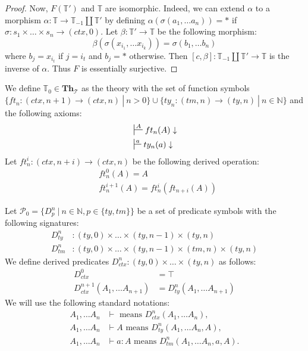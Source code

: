 \documentclass{amsart}
\theoremstyle{definition}
\theoremstyle{remark}
\newcommand{\cat}[1]{\mathbf{#1}}
\newcommand{\Th}{\cat{Th}}
\newcommand{\ThT}{\Th_{\mathcal{T}}}
\numberwithin{figure}{section}
\begin{document}
\begin{proof}
Now, $F(\mathbb{T}')$ and $\mathbb{T}$ are isomorphic.
Indeed, we can extend $\alpha$ to a morphism $\alpha : \mathbb{T} \to \mathbb{T}_{-1} \amalg \mathbb{T}'$
by defining $\alpha(\sigma(a_1, \ldots a_n)) = *$ if $\sigma : s_1 \times \ldots \times s_n \to (ctx,0)$.
Let $\beta : \mathbb{T}' \to \mathbb{T}$ be the following morphism:
\[ \beta(\sigma(x_{i_1}, \ldots x_{i_k})) = \sigma(b_1, \ldots b_n) \]
where $b_j = x_{i_t}$ if $j = i_t$ and $b_j = *$ otherwise.
Then $[c,\beta] : \mathbb{T}_{-1} \amalg \mathbb{T}' \to \mathbb{T}$ is the inverse of $\alpha$.
Thus $F$ is essentially surjective.
\end{proof}

We define $\mathbb{T}_0 \in \ThT$ as the theory with the set of function symbols $\{ ft_n : (ctx,n+1) \to (ctx,n)\ |\ n > 0 \} \cup \{ ty_n : (tm,n) \to (ty,n)\ |\ n \in \mathbb{N} \}$ and the following axioms:
\begin{align*}
& \sststile{}{A} ft_n(A) \downarrow \\
& \sststile{}{a} ty_n(a) \downarrow
\end{align*}
Let $ft^i_n : (ctx,n+i) \to (ctx,n)$ be the following derived operation:
\begin{align*}
& ft^0_n(A) = A \\
& ft^{i+1}_n(A) = ft^i_n(ft_{n+i}(A))
\end{align*}

Let $\mathcal{P}_0 = \{ D^n_p\ |\ n \in \mathbb{N}, p \in \{ ty, tm \} \}$ be a set of predicate symbols with the following signatures:
\begin{align*}
D^n_{ty} & : (ty,0) \times \ldots \times (ty,n-1) \times (ty,n) \\
D^n_{tm} & : (ty,0) \times \ldots \times (ty,n-1) \times (tm,n) \times (ty,n)
\end{align*}
We define derived predicates $D^n_{ctx} : (ty,0) \times \ldots \times (ty,n)$ as follows:
\begin{align*}
D^0_{ctx} & = \top \\
D^{n+1}_{ctx}(A_1, \ldots A_{n+1}) & = D^n_{ty}(A_1, \ldots A_{n+1})
\end{align*}
We will use the following standard notations:
\begin{align*}
A_1, \ldots A_n & \vdash \text{ means } D^n_{ctx}(A_1, \ldots A_n), \\
A_1, \ldots A_n & \vdash A \text{ means } D^n_{ty}(A_1, \ldots A_n, A), \\
A_1, \ldots A_n & \vdash a : A \text{ means } D^n_{tm}(A_1, \ldots A_n, a, A).
\end{align*}
\end{document}
